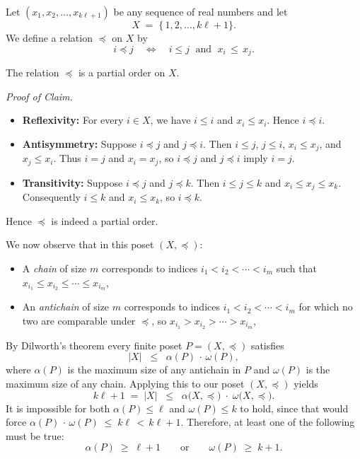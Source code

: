 \documentclass{report}
\begin{document}
\begin{proofWithHibiscus}
  Let $(x_1, x_2, \ldots, x_{k\ell + 1})$ be any sequence of real numbers and let 
  \[
    X \;=\; \{\,1,2,\ldots, k\ell + 1\}.
  \]
  We define a relation $\preceq$ on $X$ by 
  \[
    i \preceq j 
    \quad\Longleftrightarrow\quad 
    i \le j 
    \;\text{ and }\;
    x_i \,\le\, x_j.
  \]
  \smallskip

  \begin{ClaimWithMagnolia}
    The relation $\preceq$ is a partial order on $X$.
    
    \medskip
    \noindent
    \emph{Proof of Claim.} 
    \begin{itemize}
      \item \textbf{Reflexivity:} 
      For every $i \in X$, we have $i \le i$ and $x_i \le x_i$. Hence $i \preceq i$.
      
      \item \textbf{Antisymmetry:} 
      Suppose $i \preceq j$ and $j \preceq i$. Then $i \le j$, $j \le i$, $x_i \le x_j$, and $x_j \le x_i$. 
      Thus $i = j$ and $x_i = x_j$, so $i \preceq j$ and $j \preceq i$ imply $i=j$.
      
      \item \textbf{Transitivity:} 
      Suppose $i \preceq j$ and $j \preceq k$. Then $i \le j \le k$ and 
      $x_i \le x_j \le x_k$. Consequently $i \le k$ and $x_i \le x_k$, so $i \preceq k$.
    \end{itemize}
    Hence $\preceq$ is indeed a partial order.
  \end{ClaimWithMagnolia}

  \medskip
  We now observe that in this poset $(X, \preceq)$:
  \begin{itemize}
    \item A \emph{chain} of size $m$ corresponds to indices 
      $i_1 < i_2 < \cdots < i_m$ such that 
      $x_{i_1} \le x_{i_2} \le \cdots \le x_{i_m}$,
    \item An \emph{antichain} of size $m$ corresponds to indices 
      $i_1 < i_2 < \cdots < i_m$ for which no two are comparable under $\preceq$, so
      $x_{i_1} > x_{i_2} > \cdots > x_{i_m}$, 
  \end{itemize}

  By Dilworth's theorem every finite poset $P=(X,\preceq)$ satisfies
  \[
    |X|\;\;\le\;\;\alpha(P)\,\cdot\,\omega(P),
  \]
  where $\alpha(P)$ is the maximum size of any antichain in $P$ and $\omega(P)$ is the maximum size of any chain. 
  Applying this to our poset $(X,\preceq)$ yields
  \[
    k\ell + 1 
    \;=\;
    |X|
    \;\;\le\;\;
    \alpha\bigl(X,\preceq\bigr)\;\cdot\;\omega\bigl(X,\preceq\bigr).
  \]
  It is impossible for both $\alpha(P) \le \ell$ and $\omega(P) \le k$ to hold, 
  since that would force 
  \(
    \alpha(P)\,\cdot\,\omega(P) \;\le\; k\ell \,<\, k\ell+1.
  \)
  Therefore, at least one of the following must be true:
  \[
    \alpha(P) \;\ge\; \ell + 1
    \qquad\text{or}\qquad
    \omega(P) \;\ge\; k + 1.
  \]
\end{proofWithHibiscus}
\end{document}
